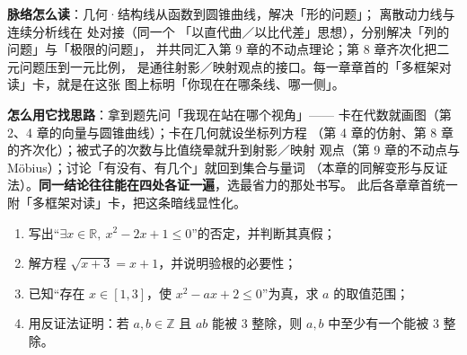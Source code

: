 \textbf{脉络怎么读}：几何·结构线从函数到圆锥曲线，解决「形的问题」；
离散动力线与连续分析线在 处对接（同一个
「以直代曲／以比代差」思想），分别解决「列的问题」与「极限的问题」，
并共同汇入第 9 章的不动点理论；第 8 章齐次化把二元问题压到一元比例，
是通往射影／映射观点的接口。每一章章首的「多框架对读」卡，就是在这张
图上标明「你现在在哪条线、哪一侧」。

\textbf{怎么用它找思路}：拿到题先问「我现在站在哪个视角」——
卡在代数就画图（第 2、4 章的向量与圆锥曲线）；卡在几何就设坐标列方程
（第 4 章的仿射、第 8 章的齐次化）；被式子的次数与比值绕晕就升到射影／映射
观点（第 9 章的不动点与 Möbius）；讨论「有没有、有几个」就回到集合与量词
（本章的同解变形与反证法）。\textbf{同一结论往往能在四处各证一遍}，选最省力的那处书写。
此后各章章首统一附「多框架对读」卡，把这条暗线显性化。

\begin{inclasstest}
\begin{enumerate}
  \item 写出“$\exists x\in\mathbb{R},\ x^2-2x+1\leq0$”的否定，并判断其真假；
  \item 解方程 $\sqrt{x+3}=x+1$，并说明验根的必要性；
  \item 已知“存在 $x\in[1,3]$，使 $x^2-ax+2\leq0$”为真，求 $a$ 的取值范围；
  \item 用反证法证明：若 $a,b\in\mathbb{Z}$ 且 $ab$ 能被 $3$ 整除，则 $a,b$ 中至少有一个能被 $3$ 整除。
\end{enumerate}
\end{inclasstest}


